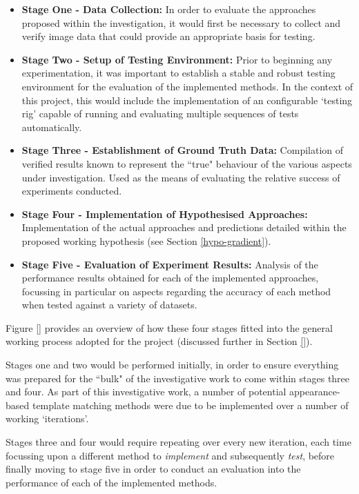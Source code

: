 \begin{itemize}
	\item \textbf{Stage One - Data Collection:} In order to evaluate the approaches proposed within the investigation, it would first be necessary to collect and verify image data that could provide an appropriate basis for testing.
	\item \textbf{Stage Two - Setup of Testing Environment:} Prior to beginning any experimentation, it was important to establish a stable and robust testing environment for the evaluation of the implemented methods. In the context of this project, this would include the implementation of an configurable `testing rig' capable of running and evaluating multiple sequences of tests automatically.
	\item \textbf{Stage Three - Establishment of Ground Truth Data:} Compilation of verified results known to represent the ``true" behaviour of the various aspects under investigation. Used as the means of evaluating the relative success of experiments conducted.
	\item \textbf{Stage Four - Implementation of Hypothesised Approaches:} Implementation of the actual approaches and predictions detailed within the proposed working hypothesis (see Section \ref{hypo-gradient}).
	\item \textbf{Stage Five - Evaluation of Experiment Results:} Analysis of the performance results obtained for each of the implemented approaches, focussing in particular on aspects regarding the accuracy of each method when tested against a variety of datasets.
\end{itemize}  

Figure \ref{} provides an overview of how these four stages fitted into the general working process adopted for the project (discussed further in Section \ref{}). 

Stages one and two would be performed initially, in order to ensure everything was prepared for the ``bulk" of the investigative work to come within stages three and four. As part of this investigative work, a number of potential appearance-based template matching methods were due to be implemented over a number of working `iterations'. 

Stages three and four would require repeating over every new iteration, each time focussing upon a different method to \textit{implement} and subsequently \textit{test}, before finally moving to stage five in order to conduct an evaluation into the performance of each of the implemented methods.

